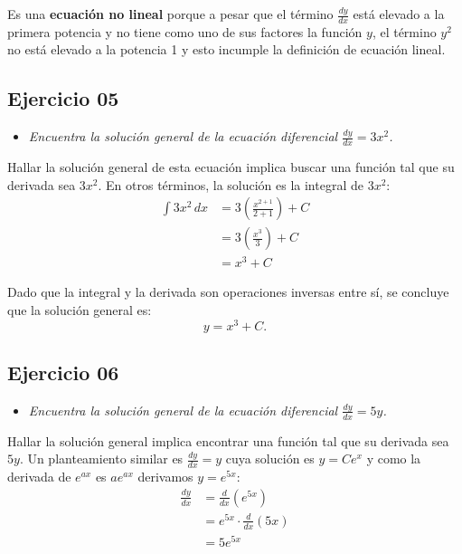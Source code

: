 \documentclass[12pt]{article}
\begin{document}
Es una \textbf{ecuación no lineal} porque a pesar que el término \(\frac{dy}{dx}\) está elevado a la primera potencia y no tiene como uno de sus factores la función \(y\), el término \(y^{2}\) no está elevado a la potencia 1 y esto incumple la definición de ecuación lineal.

\subsection*{\centering Ejercicio 05 }

\begin{itemize}
    \item \emph{Encuentra la solución general de la ecuación diferencial \(\frac{dy}{dx} = 3x^{2}\).}
\end{itemize}

Hallar la solución general de esta ecuación implica buscar una función tal que su derivada sea \(3x^{2}\). En otros términos, la solución es la integral de \(3x^{2}\):
\begin{align*}
    \int 3x^{2} \, dx &= 3 \left( \frac{x^{2 + 1}}{2 + 1} \right) + C \\
    &= 3 \left( \frac{x^{3}}{3} \right) + C \\
    &= x^{3} + C
\end{align*}

Dado que la integral y la derivada son operaciones inversas entre sí, se concluye que la solución general es:
\[ y = x^{3} + C. \]

\subsection*{\centering Ejercicio 06 }

\begin{itemize}
    \item \emph{Encuentra la solución general de la ecuación diferencial \(\frac{dy}{dx} = 5y\).}
\end{itemize}

Hallar la solución general implica encontrar una función tal que su derivada sea \(5y\). Un planteamiento similar es \(\frac{dy}{dx} = y\) cuya solución es \(y = Ce^{x}\) y como la derivada de \(e^{ax}\) es \(ae^{ax}\) derivamos \(y = e^{5x}\):
\begin{align*}
    \frac{dy}{dx} &= \frac{d}{dx}\left( e^{5x} \right) \\
    &= e^{5x} \cdot \frac{d}{dx}\left( 5x \right) \\
    &= 5e^{5x}
\end{align*}
\end{document}
